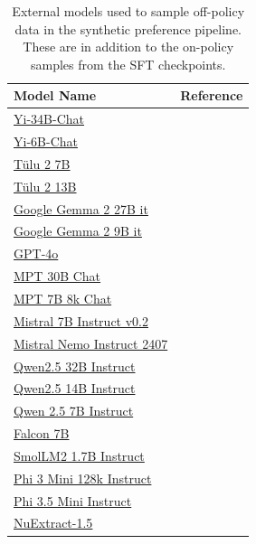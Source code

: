 \documentclass[table]{ai2style/ai2}
\begin{document}
\begin{table}[h!]
\centering
\begin{tabular}{ll}
\toprule
\textbf{Model Name} & \textbf{Reference} \\ \midrule
\href{https://huggingface.co/01-ai/Yi-34B-Chat}{Yi-34B-Chat} & \citep{young2024yi} \\ 
\href{https://huggingface.co/01-ai/Yi-6B-Chat}{Yi-6B-Chat} & \citep{young2024yi} \\ 
\href{https://huggingface.co/allenai/tulu-2-7b}{T\"ulu 2 7B} & \citep{ivison2023camels}\\ 
\href{https://huggingface.co/allenai/tulu-2-13b}{T\"ulu 2 13B} & \citep{ivison2023camels} \\ 
\href{https://huggingface.co/google/gemma-2-27b-it}{Google Gemma 2 27B it} & \citep{gemma2} \\ 
\href{https://huggingface.co/google/gemma-2-9b-it}{Google Gemma 2 9B it} & \citep{gemma2} \\ 
\href{https://platform.openai.com/docs/models#gpt-4o}{GPT-4o} & \citep{hurst2024gpt} \\ 
\href{https://huggingface.co/mosaicml/mpt-30b-chat}{MPT 30B Chat} & \citep{MosaicML2023Introducing} \\ 
\href{https://huggingface.co/mosaicml/mpt-7b-8k-chat}{MPT 7B 8k Chat} & \citep{MosaicML2023Introducing} \\ 
\href{https://huggingface.co/mistralai/Mistral-7B-Instruct-v0.2}{Mistral 7B Instruct v0.2} & \citep{jiang2023mistral} \\ 
\href{https://huggingface.co/mistralai/Mistral-Nemo-Instruct-2407}{Mistral Nemo Instruct 2407} & \citep{mistralnemo} \\ 
\href{https://huggingface.co/Qwen/Qwen2.5-32B-Instruct}{Qwen2.5 32B Instruct} & \citep{qwen2.5} \\ 
\href{https://huggingface.co/Qwen/Qwen2.5-14B-Instruct}{Qwen2.5 14B Instruct} & \citep{qwen2.5} \\ 
\href{https://huggingface.co/Qwen/Qwen2.5-7B-Instruct}{Qwen 2.5 7B Instruct} & \citep{qwen2.5} \\ 
\href{https://huggingface.co/tiiuae/falcon-7b-instruct}{Falcon 7B} & \citep{falcon40b} \\ 
\href{https://huggingface.co/HuggingFaceTB/SmolLM2-1.7B-Instruct}{SmolLM2 1.7B Instruct} & \citep{allal2024SmolLM2} \\
\href{https://huggingface.co/microsoft/Phi-3-mini-128k-instruct}{Phi 3 Mini 128k Instruct} & \citep{abdin2024phi} \\
\href{https://huggingface.co/microsoft/Phi-3.5-mini-instruct}{Phi 3.5 Mini Instruct} & \citep{abdin2024phi} \\
\href{https://huggingface.co/numind/NuExtract-1.5}{NuExtract-1.5} & \citep{NuExtract15} \\
\bottomrule
\end{tabular}
\vspace{3pt}
\caption{External models used to sample off-policy data in the synthetic preference pipeline. 
These are in addition to the on-policy samples from the SFT checkpoints.
\label{tab:pref-data}
}
\end{table}
\end{document}
